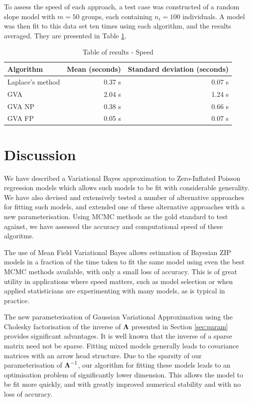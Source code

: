 \documentclass{amsart}[12pt]
\begin{document}
		
	To assess the speed of each approach, a test case was constructed of a random slope model with $m=50$ groups,	each containing $n_i = 100$ individuals. A model was then fit to this data set ten times using each algorithm, and the results averaged. They are presented in Table \ref{tab:application_slope_speed}.
		
	\begin{table}
		\caption{Table of results - Speed}
		\label{tab:application_slope_speed}
		\begin{tabular}{|l|rr|}
			\hline
			Algorithm        & Mean (seconds) & Standard deviation (seconds) \\
			\hline
			Laplace's method & 0.37 s        & 0.07 s                       \\
			GVA              & 2.04 s        & 1.24 s                       \\
			GVA NP           & 0.38 s        & 0.66 s                       \\
			GVA FP           & 0.05 s         & 0.07 s                       \\
			\hline
		\end{tabular}
	\end{table}
		
	\section{Discussion}
	\label{sec:discussion}
		
	We have described a Variational Bayes approximation to Zero-Inflated Poisson regression models which allows
	such models to be fit with considerable generality. We have also devised and extensively tested a number of
	alternative approaches for fitting such models, and extended one of these alternative approaches with a new
	parameterisation. Using MCMC methods as the gold standard to test against, we have assessed the accuracy and
	computational speed of these algoritms.
		
	The use of Mean Field Variational Bayes allows estimation of Bayesian ZIP models in a fraction of the time taken to fit the same model using even the best MCMC methods available, with only a small loss of accuracy.
	This is of great utility in applications where speed matters, such as model selection or when applied
	statisticians are experimenting with many models, as is typical in practice.
		
	The new parameterisation of Gaussian Variational Approximation using the Cholesky factorisation of the inverse of ${\boldsymbol \Lambda}$ presented in Section \ref{sec:param} provides significant advantages.  It is well known that the inverse of a sparse matrix need not be sparse. Fitting mixed models generally leads to covariance matrices with an arrow head structure. Due to the sparsity of our parameterisation of ${\boldsymbol \Lambda}^{-1}$,  our algorithm for fitting these models leads to an optimisation problem of significantly lower dimension. This allows the model to be fit more quickly, and with greatly improved numerical stability and with no loss of
	accuracy.
	
\end{document}
